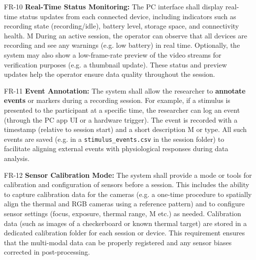 \documentclass[11pt,a4paper]{report}
\begin{document}
  FR-10                   \textbf{Real-Time Status Monitoring:} The PC interface shall display real-time status updates from each connected device, including indicators such as recording state (recording/idle), battery level, storage space, and connectivity health\cite{Picard2001}. M
                          During an active session, the operator can observe that all devices are recording and see any warnings (e.g. low battery) in real time. Optionally, the system may also show a low-frame-rate preview of the video streams for verification purposes (e.g. a thumbnail                                                                                                             
                          update)\cite{DriverStressThermal2020}. These status and preview updates help the operator ensure data quality throughout the session.                                                                                                                                  

  FR-11                   \textbf{Event Annotation:} The system shall allow the researcher to \textbf{annotate events} or markers during a recording session. For example, if a stimulus is presented to the participant at a specific time, the researcher can log an event (through the PC app UI or a hardware trigger). The event is recorded with a timestamp (relative to session start) and a short description M
                          or type\cite{GSRFacialThermal2021}. All such events are saved (e.g. in a \texttt{stimulus\_events.csv} in the session folder) to facilitate aligning external events with physiological responses during data analysis.           

  FR-12                   \textbf{Sensor Calibration Mode:} The system shall provide a mode or tools for calibration and configuration of sensors before a session. This includes the ability to capture calibration data for the cameras (e.g. a one-time procedure to spatially align the thermal and RGB cameras using a reference pattern) and to configure sensor settings (focus, exposure, thermal range,  M
                          etc.) as needed. Calibration data (such as images of a checkerboard or known thermal target) are stored in a dedicated calibration folder for each session or                                                                                                                                                                                                                      
                          device\cite{StressDefinitionHH}\cite{CortisolStressIndicator2020}.   
                          This requirement ensures that the multi-modal data can be properly registered and any sensor biases corrected in post-processing.                                                                                                                                                                                                                                                  
\end{document}
